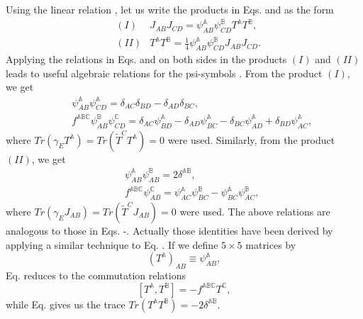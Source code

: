\documentclass[12pt,epsf]{article}
\begin{document}
Using the linear relation , let us write the products in Eqs.  and 
as the form
\begin{eqnarray}
   &(I)&  J_{AB} J_{CD} =  \psi^\mathbb{A}_{AB} \psi^\mathbb{B}_{CD} T^\mathbb{A} T^\mathbb{B}, \\
   &(II)&  T^\mathbb{A} T^\mathbb{B} = \frac{1}{4} \psi^\mathbb{A}_{AB} \psi^\mathbb{B}_{CD} J_{AB} J_{CD}.
\end{eqnarray}
Applying the relations in Eqs.  and  on both sides in the products $(I)$ and $(II)$
leads to useful algebraic relations for the psi-symbols .
From the product $(I)$, we get
\begin{eqnarray} \label{5eta-1}
  &&  \psi^\mathbb{A}_{AB} \psi^\mathbb{A}_{CD} = \delta_{AC} \delta_{BD} - \delta_{AD} \delta_{BC}, \\
  \label{5eta-2}
  &&  f^{\mathbb{A} \mathbb{B} \mathbb{C}} \psi^\mathbb{B}_{AB} \psi^\mathbb{C}_{CD}
  = \delta_{AC} \psi^\mathbb{A}_{BD} - \delta_{AD} \psi^\mathbb{A}_{BC} - \delta_{BC} \psi^\mathbb{A}_{AD}
  + \delta_{BD} \psi^\mathbb{A}_{AC},
\end{eqnarray}
where $Tr (\gamma_E T^\mathbb{A}) = Tr ( \widetilde{T}^C T^\mathbb{A}) = 0$ were used.
Similarly, from the product $(II)$, we get
\begin{eqnarray} \label{5eta-3}
  &&  \psi^\mathbb{A}_{AB} \psi^\mathbb{B}_{AB} = 2 \delta^{\mathbb{A}\mathbb{B}}, \\
  \label{5eta-4}
  &&  f^{\mathbb{A} \mathbb{B} \mathbb{C}} \psi^\mathbb{C}_{AB}
  = \psi^\mathbb{A}_{AC} \psi^\mathbb{B}_{BC} - \psi^\mathbb{A}_{BC} \psi^\mathbb{B}_{AC},
\end{eqnarray}
where $Tr (\gamma_E J_{AB}) = Tr ( \widetilde{T}^C J_{AB}) = 0$ were used.
The above relations are analogous to those in Eqs. -.
Actually those identities have been derived by applying a similar technique to Eq. .
If we define $5 \times 5$ matrices by
\begin{equation}\label{5-sp2}
  (T^\mathbb{A})_{AB} \equiv \psi^\mathbb{A}_{AB},
\end{equation}
Eq.  reduces to the commutation relations
\begin{equation}\label{5lie-sp2}
  [T^\mathbb{A}, T^\mathbb{B}] = - f^{\mathbb{A} \mathbb{B} \mathbb{C}} T^\mathbb{C},
\end{equation}
while Eq.  gives us the trace $Tr( T^\mathbb{A} T^\mathbb{B} ) = - 2 \delta^{\mathbb{A}\mathbb{B}}$.
\end{document}
